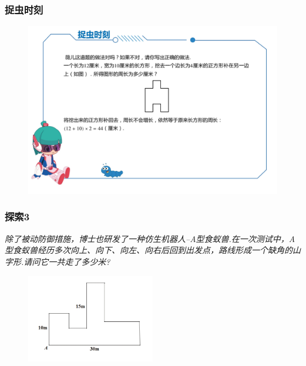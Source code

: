 \begin{frame}
    \frametitle{捉虫时刻}
    \begin{figure}[H] 
        \centering
        \includegraphics[width=1\textwidth]{./pics/Chapter_1/zhuochong1.png}
    \end{figure}
\end{frame}

\begin{frame}
    \frametitle{探索3}
    \textit{除了被动防御措施，博士也研发了一种仿生机器人--A型食蚁兽.在一次测试中，A型食蚁兽经历多次向上、向下、向左、向右后回到出发点，路线形成一个缺角的山字形.请问它一共走了多少米?}
    \begin{figure}[H] 
        \centering
        \includegraphics[width=0.5\textwidth]{./pics/Chapter_1/tansuo3.png}
    \end{figure}
\end{frame}

